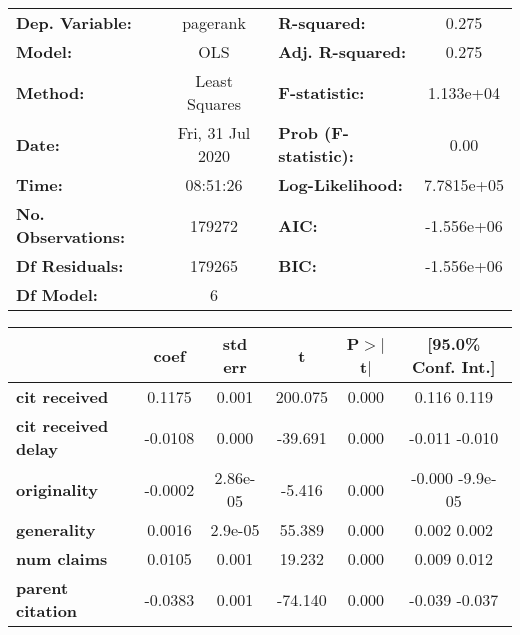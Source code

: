 \begin{center}
\begin{tabular}{lclc}
\toprule
\textbf{Dep. Variable:}     &     pagerank     & \textbf{  R-squared:         } &       0.275    \\
\textbf{Model:}             &       OLS        & \textbf{  Adj. R-squared:    } &       0.275    \\
\textbf{Method:}            &  Least Squares   & \textbf{  F-statistic:       } &   1.133e+04    \\
\textbf{Date:}              & Fri, 31 Jul 2020 & \textbf{  Prob (F-statistic):} &       0.00     \\
\textbf{Time:}              &     08:51:26     & \textbf{  Log-Likelihood:    } &   7.7815e+05   \\
\textbf{No. Observations:}  &      179272      & \textbf{  AIC:               } &   -1.556e+06   \\
\textbf{Df Residuals:}      &      179265      & \textbf{  BIC:               } &   -1.556e+06   \\
\textbf{Df Model:}          &           6      & \textbf{                     } &                \\
\bottomrule
\end{tabular}
\begin{tabular}{lccccc}
                            & \textbf{coef} & \textbf{std err} & \textbf{t} & \textbf{P$>$$|$t$|$} & \textbf{[95.0\% Conf. Int.]}  \\
\midrule
\textbf{cit received}       &       0.1175  &        0.001     &   200.075  &         0.000        &         0.116     0.119       \\
\textbf{cit received delay} &      -0.0108  &        0.000     &   -39.691  &         0.000        &        -0.011    -0.010       \\
\textbf{originality}        &      -0.0002  &     2.86e-05     &    -5.416  &         0.000        &        -0.000  -9.9e-05       \\
\textbf{generality}         &       0.0016  &      2.9e-05     &    55.389  &         0.000        &         0.002     0.002       \\
\textbf{num claims}         &       0.0105  &        0.001     &    19.232  &         0.000        &         0.009     0.012       \\
\textbf{parent citation}    &      -0.0383  &        0.001     &   -74.140  &         0.000        &        -0.039    -0.037       \\

\end{tabular}
\end{center}
